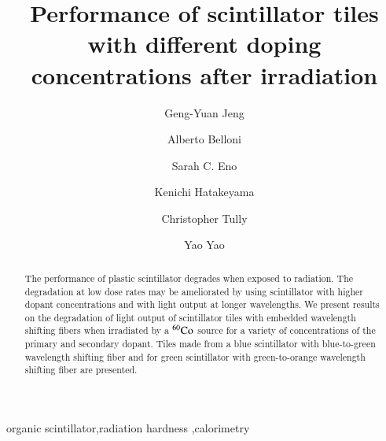 \documentclass[review]{elsarticle}
\begin{document}
\begin{frontmatter}

\title{Performance of scintillator tiles with different doping concentrations after irradiation }


\author[umd]{Geng-Yuan Jeng}
\author[umd]{Alberto Belloni}
\author[umd]{Sarah C. Eno}
\author[baylor]{Kenichi Hatakeyama}
\author[princeton]{Christopher Tully}
\author[umd]{Yao Yao}


\address[umd]{Dept. Physics, U. Maryland, College Park MD 30742 USA}
\address[eljen]{Eljen Technology, 1300 W. Broadway, Sweetwater, Tx 79556 USA}
\address[fnal]{Fermi National Accelerator Laboratory, Batavia, IL, USA}
\address[baylor]{Baylor University, Waco, Texas, USA}
\address[princeton]{Princeton University, Princeton, NJ, USA}

\begin{abstract}
The performance of plastic scintillator degrades when exposed to radiation. 
The degradation at low dose rates may be ameliorated by using scintillator
with higher dopant concentrations and with light output at longer wavelengths.
We present results on the degradation of light output of scintillator
tiles with embedded wavelength shifting  fibers  when irradiated by a $\rm{^{60}Co}$ source for a variety of concentrations of the primary and secondary dopant.  Tiles made from a blue scintillator with blue-to-green wavelength shifting fiber and for green scintillator with green-to-orange wavelength shifting fiber are presented.
\end{abstract}

\begin{keyword}
organic scintillator\sep radiation hardness \sep calorimetry
\end{keyword}

\end{frontmatter}

\linenumbers
\end{document}
